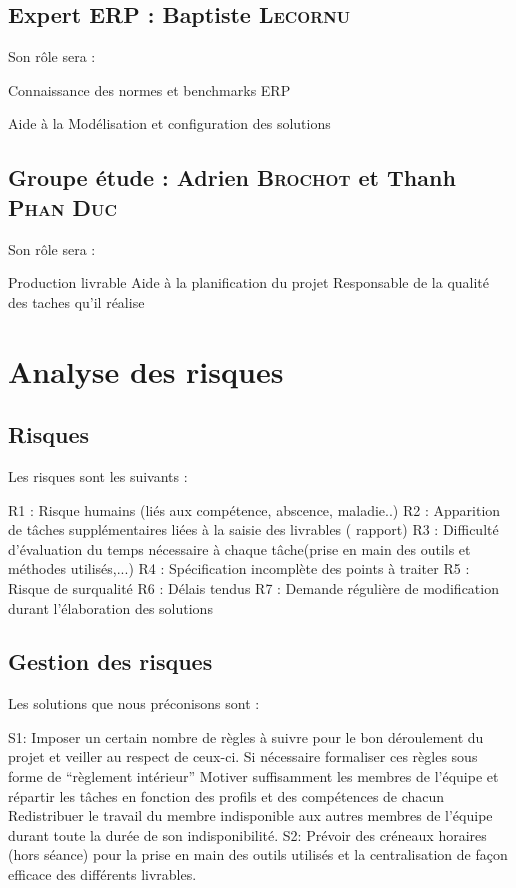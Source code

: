 {\subsection{Expert ERP : Baptiste \textsc{Lecornu}}

Son rôle sera :

    Connaissance des normes et benchmarks ERP

    Aide à la Modélisation et configuration des solutions 


\subsection{Groupe étude : Adrien \textsc{Brochot} et Thanh \textsc{Phan Duc}}

Son rôle sera :

    Production livrable
    Aide à la planification du projet
    Responsable de la qualité des taches qu’il réalise



\section{Analyse des risques}
\subsection{Risques}

Les risques sont les suivants :

    R1 :  Risque humains (liés aux compétence, abscence, maladie..)
    R2 : Apparition de tâches supplémentaires liées à la saisie des livrables ( rapport)
    R3 : Difficulté d’évaluation du temps nécessaire à chaque tâche(prise en main des outils et méthodes utilisés,...)
    R4 : Spécification incomplète des points à traiter
    R5 : Risque de surqualité
    R6 : Délais tendus
    R7 : Demande régulière de modification durant l’élaboration des solutions



\subsection{Gestion des risques}

Les solutions que nous préconisons sont :

    S1:
        Imposer un certain nombre de règles à suivre pour le bon déroulement du projet et veiller au respect de ceux-ci. Si nécessaire formaliser ces règles sous forme de “règlement intérieur”
        Motiver suffisamment les membres de l’équipe  et répartir les tâches en fonction des profils et des compétences de chacun
        Redistribuer le travail du membre indisponible aux autres membres de l’équipe durant toute la durée de son indisponibilité.
    S2:
    Prévoir des créneaux horaires (hors séance) pour la prise en main des outils utilisés  et la centralisation de façon efficace des différents livrables.

}
